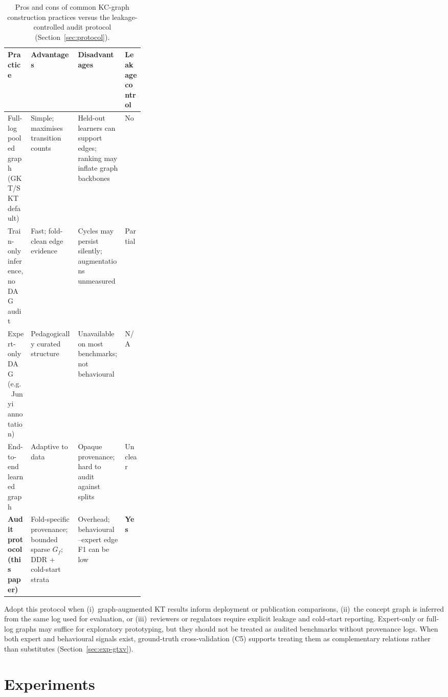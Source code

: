 \documentclass[preprint,10pt,doubleblind]{elsarticle}
\newcommand{\DDR}{\textsc{DDR}}
\begin{document}
\begin{table}[t]
\centering
\caption{Pros and cons of common KC-graph construction practices versus
the leakage-controlled audit protocol (Section~\ref{sec:protocol}).}
\label{tab:protocol-comparison}
\footnotesize
\setlength{\tabcolsep}{3pt}
\begin{tabularx}{\linewidth}{@{} >{\RaggedRight\arraybackslash}p{0.17\linewidth} >{\RaggedRight\arraybackslash}X >{\RaggedRight\arraybackslash}X >{\RaggedRight\arraybackslash}p{0.14\linewidth} @{}}
\toprule
Practice & Advantages & Disadvantages & Leakage control \\
\midrule
Full-log pooled graph (GKT/SKT default) &
Simple; maximises transition counts &
Held-out learners can support edges; ranking may inflate graph backbones &
No \\
\midrule
Train-only inference, no DAG audit &
Fast; fold-clean edge evidence &
Cycles may persist silently; augmentations unmeasured &
Partial \\
\midrule
Expert-only DAG (e.g.\ Junyi annotation) &
Pedagogically curated structure &
Unavailable on most benchmarks; not behavioural &
N/A \\
\midrule
End-to-end learned graph &
Adaptive to data &
Opaque provenance; hard to audit against splits &
Unclear \\
\midrule
\textbf{Audit protocol (this paper)} &
Fold-specific provenance; bounded sparse $G_f$; \DDR{} + cold-start strata &
Overhead; behavioural--expert edge F1 can be low &
\textbf{Yes} \\
\bottomrule
\end{tabularx}
\end{table}

Adopt this protocol when (i)~graph-augmented KT results inform deployment
or publication comparisons, (ii)~the concept graph is inferred from the
same log used for evaluation, or (iii)~reviewers or regulators require
explicit leakage and cold-start reporting. Expert-only or full-log graphs
may suffice for exploratory prototyping, but they should not be treated as
audited benchmarks without provenance logs. When both expert and behavioural
signals exist, ground-truth cross-validation (C5) supports treating them as
complementary relations rather than substitutes (Section~\ref{sec:exp-gtxv}).
\section{Experiments}
\label{sec:exp}
\end{document}
